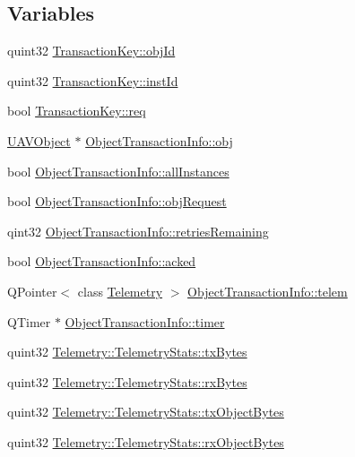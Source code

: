 \subsection*{Variables}
\begin{DoxyCompactItemize}
\item 
quint32 \hyperlink{group___u_a_v_talk_plugin_ga23b79980c6f897e84ca1b88c5bb532ad}{Transaction\-Key\-::obj\-Id}
\item 
quint32 \hyperlink{group___u_a_v_talk_plugin_ga3d92643b78ea3e10cd9ac1ac2cc4b5f7}{Transaction\-Key\-::inst\-Id}
\item 
bool \hyperlink{group___u_a_v_talk_plugin_gafe5007a7f451f47110150ee417594a38}{Transaction\-Key\-::req}
\item 
\hyperlink{class_u_a_v_object}{U\-A\-V\-Object} $\ast$ \hyperlink{group___u_a_v_talk_plugin_ga9ad43239e470da9249f214e43521bddb}{Object\-Transaction\-Info\-::obj}
\item 
bool \hyperlink{group___u_a_v_talk_plugin_gaf134962f4df09323cf89245e3bc32f6e}{Object\-Transaction\-Info\-::all\-Instances}
\item 
bool \hyperlink{group___u_a_v_talk_plugin_ga35e10d2ea8bcd4f4bd1e32db43857e2c}{Object\-Transaction\-Info\-::obj\-Request}
\item 
qint32 \hyperlink{group___u_a_v_talk_plugin_gaf7cfad07635a777272c96c4b2fb2284b}{Object\-Transaction\-Info\-::retries\-Remaining}
\item 
bool \hyperlink{group___u_a_v_talk_plugin_ga27c9898b3e1a5940f0340891578f6ea5}{Object\-Transaction\-Info\-::acked}
\item 
Q\-Pointer$<$ class \hyperlink{class_telemetry}{Telemetry} $>$ \hyperlink{group___u_a_v_talk_plugin_ga1df77178093618626fe21d5bc58b03f4}{Object\-Transaction\-Info\-::telem}
\item 
Q\-Timer $\ast$ \hyperlink{group___u_a_v_talk_plugin_gaf400de9c7d9b37a52e821b1a7bc6580e}{Object\-Transaction\-Info\-::timer}
\item 
quint32 \hyperlink{group___u_a_v_talk_plugin_ga349d8c0f2aac815d79b13e54f818658c}{Telemetry\-::\-Telemetry\-Stats\-::tx\-Bytes}
\item 
quint32 \hyperlink{group___u_a_v_talk_plugin_gadda927fbb6858f5e60b6daf16d5bc94e}{Telemetry\-::\-Telemetry\-Stats\-::rx\-Bytes}
\item 
quint32 \hyperlink{group___u_a_v_talk_plugin_ga5c315107de95913671e9bd51ce699e1f}{Telemetry\-::\-Telemetry\-Stats\-::tx\-Object\-Bytes}
\item 
quint32 \hyperlink{group___u_a_v_talk_plugin_ga495b5acf35424dbdf221e81f0024ae92}{Telemetry\-::\-Telemetry\-Stats\-::rx\-Object\-Bytes}

\end{DoxyCompactItemize}
